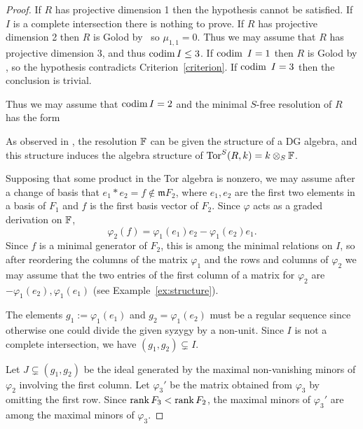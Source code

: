 \documentclass[11pt]{amsart}
\def\phi{{\varphi}}
\def\gm{{\mathfrak m}}
\begin{document}
\begin{proof}
If $R$ has projective dimension 1 then the hypothesis cannot be satisfied. If $I$ is a complete intersection there is nothing to prove. 
If $R$ has 
projective dimension 2 then $R$ is Golod by~\cite[5.3.4]{AvramovInfinite} so $\mu_{1,1}=0$. Thus we may assume that
$R$ has projective dimension 3, and thus $\operatorname{codim} I\leq 3$. If $\operatorname{codim}\ I =1$ then $R$ is Golod by 
\cite[Proposition 5.2.5]{AvramovInfinite}, so the hypothesis contradicts Criterion~\ref{criterion}.  If $\operatorname{codim}\ I = 3$ then the conclusion is trivial.

Thus we may assume that $\operatorname{codim} I = 2$ and the minimal $S$-free resolution of $R$ has the form 
\begin{center}
\end{center}

 As observed in \cite{Gor3},
 the resolution ${\mathbb F}$ can be given the structure of a DG algebra, and this structure induces the algebra structure of $\operatorname{Tor}^{S}(R,k) = k\otimes_{S}{\mathbb F}$.
 
Supposing that some product in the Tor algebra is nonzero, we may assume after a change of basis that  $e_{1} *e_{2} =  f\notin \gm F_{2}$, where $e_{1}, e_{2}$ are the first two elements in a basis of $F_{1}$ and $f$ is the first basis vector of $F_{2}$.  Since $\phi$ acts as a graded derivation on ${\mathbb F}$,
 $$
 \phi_{2}(f) = \phi_{1}(e_{1})e_{2}- \phi_{1}(e_{2})e_{1}.
 $$
 Since $f$ is a minimal generator of $F_{2}$, this is among the minimal relations on $I$, so after reordering the columns of the matrix $\phi_1$ and the rows and columns of $\phi_{2}$
 we may assume that the two entries of the first column of a matrix for $\phi_2$ are $-\phi_{1}(e_{2}), \phi_{1}(e_{1})$ (see Example~\ref{ex:structure}).

The elements $g_{1}:=\phi_{1}(e_{1})$ and $g_{2}=\phi_{1}(e_{2})$ must be a regular sequence since otherwise one could divide the given syzygy by a non-unit. Since $I$ is not a complete intersection, we have $(g_{1}, g_{2})\subsetneq I$.
  
 Let $J \subsetneq (g_{1}, g_{2})$ be the ideal generated by the maximal non-vanishing minors of $\phi_{2}$ involving the first column. Let $\phi_{3}'$ be the matrix obtained from $\phi_{3}$
 by omitting the first row.  Since $\operatorname{rank} F_3 < \operatorname{rank} F_2$, the maximal minors of $\phi_3'$ are among the maximal minors of $\phi_3$.
 

\end{proof}
\end{document}
